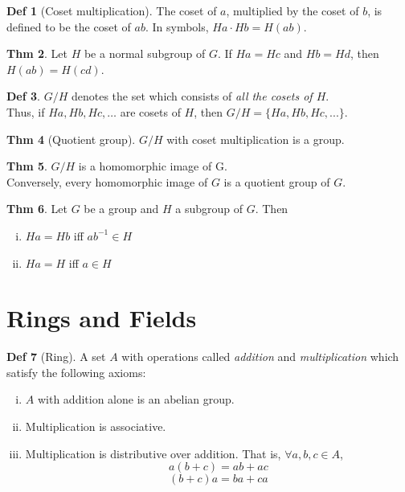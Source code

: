 \documentclass{article}
\theoremstyle{definition}
\newtheorem{definition}{Def}[section]
\newtheorem{theorem}[definition]{Thm}
\begin{document}
\begin{definition}[Coset multiplication]
    The coset of $a$, multiplied by the coset of $b$, is defined to be the coset of $ab$. In symbols, $Ha \cdot Hb = H(ab)$.
\end{definition}

\begin{theorem}
    Let $H$ be a normal subgroup of $G$. If $Ha = Hc$ and $Hb = Hd$, then $H(ab) = H(cd)$.
\end{theorem}

\begin{definition}
    $G/H$ denotes the set which consists of \emph{all the cosets of $H$}.
    \\
    Thus, if $Ha, Hb, Hc, \ldots$ are cosets of $H$, then $G/H = \{ Ha, Hb, Hc, ... \}$.
\end{definition}

\begin{theorem}[Quotient group]
    $G/H$ with coset multiplication is a group.
\end{theorem}

\begin{theorem}
    $G/H$ is a homomorphic image of G.
    \\
    Conversely, every homomorphic image of $G$ is a quotient group of $G$.
\end{theorem}

\begin{theorem}
    Let $G$ be a group and $H$ a subgroup of $G$. Then
    \begin{enumerate}[i.]
	\item $Ha = Hb$ iff ${ab}^{-1} \in H$
	\item $Ha = H$ iff $a \in H$
    \end{enumerate}
\end{theorem}


\section{Rings and Fields}

\begin{definition}[Ring]
    A set $A$ with operations called \emph{addition} and \emph{multiplication} which satisfy the following axioms:
    \begin{enumerate}[i.]
	\item $A$ with addition alone is an abelian group.
	\item Multiplication is associative.
	\item Multiplication is distributive over addition. That is, $\forall a,b,c \in A$,
	    $$a(b+c) = ab + ac$$
	    $$(b+c)a = ba + ca$$
    \end{enumerate}
\end{definition}
\end{document}

